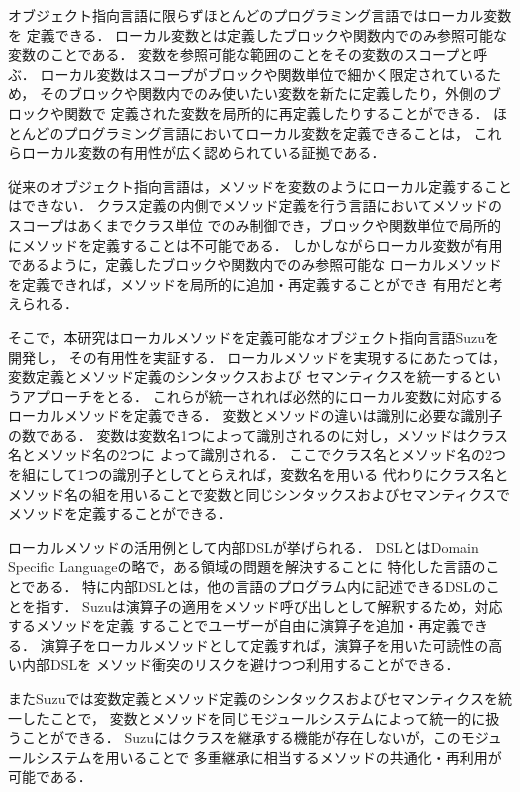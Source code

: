 \documentclass[a4paper,11pt,dvipdfmx]{jreport}
\begin{document}
オブジェクト指向言語に限らずほとんどのプログラミング言語ではローカル変数を
定義できる．
ローカル変数とは定義したブロックや関数内でのみ参照可能な変数のことである．
変数を参照可能な範囲のことをその変数のスコープと呼ぶ．
ローカル変数はスコープがブロックや関数単位で細かく限定されているため，
そのブロックや関数内でのみ使いたい変数を新たに定義したり，外側のブロックや関数で
定義された変数を局所的に再定義したりすることができる．
ほとんどのプログラミング言語においてローカル変数を定義できることは，
これらローカル変数の有用性が広く認められている証拠である．

従来のオブジェクト指向言語は，メソッドを変数のようにローカル定義することはできない．
クラス定義の内側でメソッド定義を行う言語においてメソッドのスコープはあくまでクラス単位
でのみ制御でき，ブロックや関数単位で局所的にメソッドを定義することは不可能である．
しかしながらローカル変数が有用であるように，定義したブロックや関数内でのみ参照可能な
ローカルメソッドを定義できれば，メソッドを局所的に追加・再定義することができ
有用だと考えられる．

そこで，本研究はローカルメソッドを定義可能なオブジェクト指向言語Suzuを開発し，
その有用性を実証する．
ローカルメソッドを実現するにあたっては，変数定義とメソッド定義のシンタックスおよび
セマンティクスを統一するというアプローチをとる．
これらが統一されれば必然的にローカル変数に対応するローカルメソッドを定義できる．
変数とメソッドの違いは識別に必要な識別子の数である．
変数は変数名1つによって識別されるのに対し，メソッドはクラス名とメソッド名の2つに
よって識別される．
ここでクラス名とメソッド名の2つを組にして1つの識別子としてとらえれば，変数名を用いる
代わりにクラス名とメソッド名の組を用いることで変数と同じシンタックスおよびセマンティクスで
メソッドを定義することができる．

ローカルメソッドの活用例として内部DSLが挙げられる．
DSLとはDomain Specific Languageの略で，ある領域の問題を解決することに
特化した言語のことである．
特に内部DSLとは，他の言語のプログラム内に記述できるDSLのことを指す．
Suzuは演算子の適用をメソッド呼び出しとして解釈するため，対応するメソッドを定義
することでユーザーが自由に演算子を追加・再定義できる．
演算子をローカルメソッドとして定義すれば，演算子を用いた可読性の高い内部DSLを
メソッド衝突のリスクを避けつつ利用することができる．

またSuzuでは変数定義とメソッド定義のシンタックスおよびセマンティクスを統一したことで，
変数とメソッドを同じモジュールシステムによって統一的に扱うことができる．
Suzuにはクラスを継承する機能が存在しないが，このモジュールシステムを用いることで
多重継承に相当するメソッドの共通化・再利用が可能である．
\end{document}
